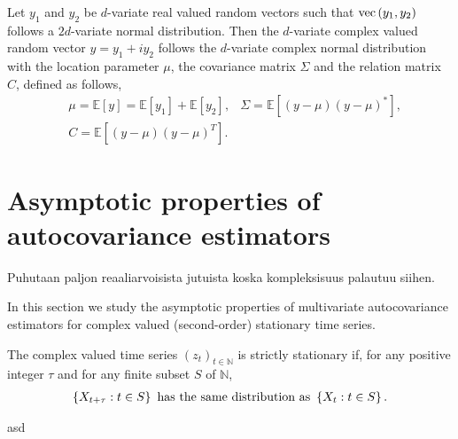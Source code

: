\documentclass[11pt,a4paper,leqno]{amsart}
\newcommand{\1}{\mathbbm{1}}
\newcommand{\ve}{\textnormal{vec}}
\newcommand{\N}{\mathbb{N}}
\newcommand{\E}{\mathbb{E}}
\newcommand{\0}{\mathbf{0}}
\begin{document}
Let $y_1$ and $y_2$ be $d$-variate real valued random vectors such that $\ve\left(y_1,y_2\right)$ follows a $2d$-variate normal distribution. Then the $d$-variate complex valued random vector $y = y_1 +iy_2$ follows the $d$-variate complex normal distribution with the location parameter $\mu$, the covariance matrix $\Sigma$ and the relation matrix $C$, defined as follows, 
\begin{align*}
&\mu = \E\left[y\right] = \E\left[y_1\right] + \E\left[ y_2 \right],
& \Sigma = \E\left[\left( y - \mu  \right) \left(y - \mu \right)^* \right],\\
& C = \E\left[\left( y - \mu  \right) \left(y - \mu \right)^T \right].
\end{align*}





\section{Asymptotic properties of autocovariance estimators}
\label{sec:results}
Puhutaan paljon reaaliarvoisista jutuista koska kompleksisuus palautuu siihen. 

In this section we study the asymptotic properties of multivariate autocovariance estimators for complex valued (second-order) stationary time series. 


\begin{dfn}[Stationarity]
The complex valued time series $\left(z_t\right)_{t\in \N}$ is strictly stationary if, for any positive integer $\tau$ and for any finite subset $S$ of $\N$,
\begin{align*}
\left\{ X_{t+\tau}: t\in S\right\} \textnormal{ has the same distribution as } \left\{ X_{t}: t\in S\right\}.
\end{align*}

\end{dfn}

\begin{rem}
asd
\end{rem}
\end{document}
